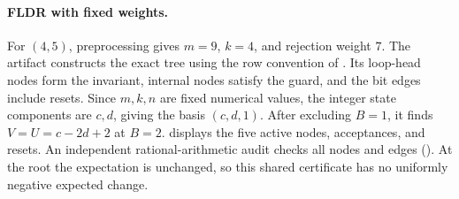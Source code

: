 \paragraph{FLDR with fixed weights.}
For $(4,5)$, preprocessing gives $m=9$, $k=4$, and rejection weight $7$.
The artifact constructs the exact tree using the row convention of
. Its loop-head nodes form the invariant, internal nodes
satisfy the guard, and the bit edges include resets. Since $m,k,n$ are
fixed numerical values, the integer state components are $c,d$, giving
the basis $(c,d,1)$. After excluding $B=1$, it finds
$V=U=c-2d+2$ at $B=2$.  displays the
five active nodes, acceptances, and resets. An independent rational-arithmetic
audit checks all nodes and edges (). At the root the
expectation is unchanged, so this shared certificate has no uniformly
negative expected change.
